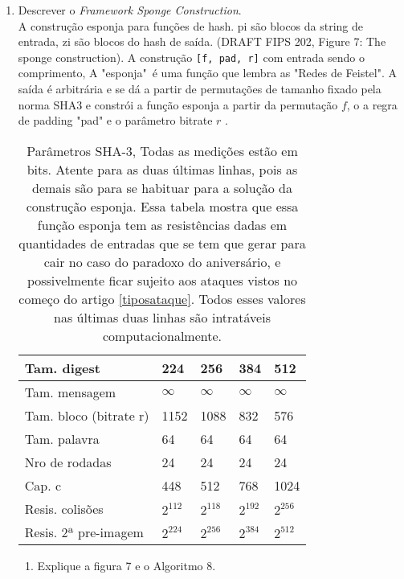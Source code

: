 \documentclass[12pt, a4paper]{article}
\begin{document}
\begin{enumerate}
\begin{enumerate}
\begin{enumerate}
\end{enumerate}

\item Descrever o \textit{Framework Sponge Construction}.\\

A construção esponja para funções de hash. pi são blocos da string de entrada,
zi são blocos do hash de saída. (DRAFT FIPS 202, Figure 7: The sponge
construction). A construção \verb|[f, pad, r]| com entrada sendo o comprimento,
A "esponja"\ é uma função que lembra as "Redes de Feistel". A saída é arbitrária
e se dá a partir de permutações de tamanho fixado pela norma SHA3 e constrói a
função esponja a partir da permutação $f$, o a regra de padding "pad" e o
parâmetro bitrate $r$ \cite{bertoni}.\\

\begin{table}[ht!]
\centering
\label{sha3tablepar}
\begin{tabular}{|l|l|l|l|l|}
\hline Tam. digest & 224 & 256 & 384 & 512 \\
\hline Tam. mensagem & $\infty$ & $\infty$ & $\infty$ & $\infty$ \\
\hline Tam. bloco (bitrate r) & 1152 & 1088 & 832 & 576 \\
\hline Tam. palavra & 64 & 64 & 64 & 64 \\
\hline Nro de rodadas & 24 & 24 & 24 & 24 \\
\hline Cap. c & 448 & 512 & 768 & 1024 \\
\hline Resis. colisões & $2^{112}$ & $2^{118}$ & $2^{192}$ & $2^{256}$ \\
\hline Resis. 2ª pre-imagem & $2^{224}$ & $2^{256}$ & $2^{384}$ & $2^{512}$ \\
\hline
\end{tabular}
\caption{Parâmetros SHA-3, Todas as medições estão em bits. Atente para as duas
últimas linhas, pois as demais são para se habituar para a solução da construção
esponja. Essa tabela mostra que essa função esponja tem as resistências dadas em
quantidades de entradas que se tem que gerar para cair no caso do paradoxo do
aniversário, e possivelmente ficar sujeito aos ataques vistos no começo do
artigo \ref{tiposataque}. Todos esses valores nas últimas duas linhas são
intratáveis computacionalmente.}
\end{table}

  \begin{enumerate}
    \item Explique a figura 7 e o Algoritmo 8.\\


\end{enumerate}
\end{enumerate}
\end{enumerate}
\end{document}
